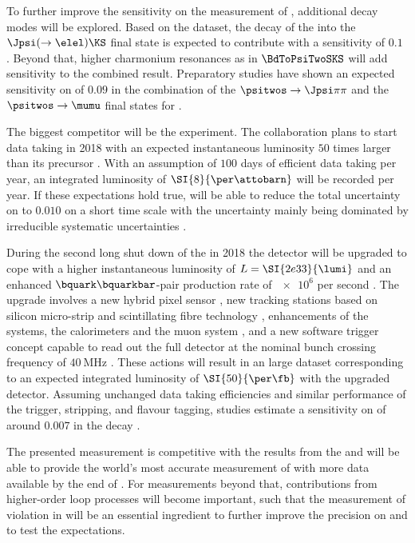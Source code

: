 To further improve the sensitivity on the measurement of \sintwobeta, additional
decay modes will be explored. Based on the \RunOne dataset, the decay of the \Bd
into the $\Jpsi (\to\elel) \KS$ final state is expected to contribute with a
sensitivity of $\num{0.1}$ \cite{bdtojpsieeks:ramon}. Beyond that, higher
charmonium resonances as in $\BdToPsiTwoSKS$ will add sensitivity to the
combined result. Preparatory studies have shown an expected sensitivity on
\sintwobeta of $\num{0.09}$ in the combination of the $\psitwos\to\Jpsi\pi\pi$
and the $\psitwos\to\mumu$ final states for \RunOne \cite{Mueller:2014}.

The biggest \LHCb competitor will be the \BelleTwo experiment. The collaboration
plans to start data taking in 2018 with an expected instantaneous luminosity
$\num{50}$ times larger than its precursor \Belle. With an assumption of
$\num{100}$ days of efficient data taking per year, an integrated luminosity of
$\SI{8}{\per\attobarn}$ will be recorded per year. If these expectations hold
true, \BelleTwo will be able to reduce the total uncertainty on \sintwobeta to
$\num{0.010}$ on a short time scale with the uncertainty mainly being dominated
by irreducible systematic uncertainties \cite{Aushev:2010bq}.

During the second long shut down of the \LHC in 2018 the \LHCb detector will be
upgraded to cope with a higher instantaneous luminosity of $L =
\SI{2e33}{\lumi}$ and an enhanced $\bquark\bquarkbar$-pair production rate of
$\num{e6}$ per second \cite{Bediaga:1443882}. The upgrade involves a new hybrid
pixel sensor \VELO \cite{TDRVELO}, new tracking stations based on silicon
micro-strip and scintillating fibre technology \cite{TDRTracking}, enhancements
of the \RICH systems, the calorimeters and the muon system \cite{TDRPID}, and a
new software trigger concept capable to read out the full detector at the
nominal bunch crossing frequency of $\SI{40}{\mega\hertz}$ \cite{TDRTrigger}.
These actions will result in an large dataset corresponding to an expected
integrated luminosity of $\SI{50}{\per\fb}$ with the upgraded detector. Assuming
unchanged data taking efficiencies and similar performance of the trigger,
stripping, and flavour tagging, \ToyMC studies estimate a sensitivity on
\sintwobeta of around $\num{0.007}$ \cite{Moedden:2015} in the decay
\BdToJpsiKS.

The presented measurement is competitive with the results from the \BFactories and
\LHCb will be able to provide the world's most accurate measurement of
\sintwobeta with more data available by the end of \RunTwo. For measurements
beyond that, contributions from higher-order loop processes will become
important, such that the measurement of \CP violation in \BsToJpsiKS will be an
essential ingredient to further improve the precision on \sintwobeta and to test
the \SM expectations.


